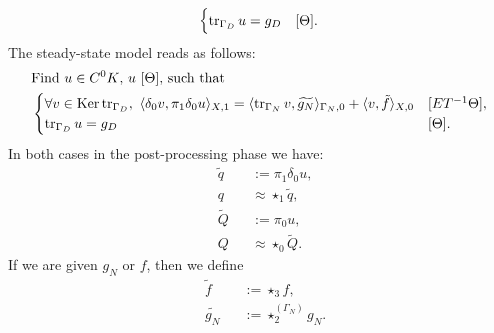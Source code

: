 \begin{formulation}
\begin{equation}
\begin{split}
\begin{cases}
        \mathop{\rm tr}\nolimits_{\Gamma_D} u = g_D & [\Theta].
      \end{cases}
    \end{split}
  \end{equation}
  The steady-state model reads as follows:
  \begin{equation}
    \begin{split}
      & \text{Find $u \in C^0 K$, $u\ [\Theta]$, such that} \\
      &
      \begin{cases}
        \forall v \in \mathop{\rm Ker}\nolimits \mathop{\rm tr}\nolimits_{\Gamma_D},\
          \langle\delta_0 v,\pi_1 \delta_0 u\rangle_{X, 1}
          = \langle\mathop{\rm tr}\nolimits_{\Gamma_N} v,\widetilde{g_N}\rangle_{\Gamma_N, 0}
          + \langle v,\tilde{f}\rangle_{X, 0}
      & [E T^{-1} \Theta], \\
        \mathop{\rm tr}\nolimits_{\Gamma_D} u = g_D & [\Theta].
      \end{cases}
    \end{split}
  \end{equation}
  In both cases in the post-processing phase we have:
  \begin{subequations}
    \begin{alignat}{2}
      & \tilde{q} && := \pi_1 \delta_0 u, \\
      & q && \approx \star_1 \tilde{q}, \\
      & \tilde{Q} && := \pi_0 u, \\
      & Q && \approx \star_0 \tilde{Q}.
    \end{alignat}
  \end{subequations}
  If we are given $g_N$ or $f$, then we define
  \begin{subequations}
    \begin{alignat}{2}
      & \tilde{f} && := \star_3 f, \\
      & \tilde{g_N} && := \star_2^{(\Gamma_N)} g_N.
    \end{alignat}
  \end{subequations}
\end{formulation}
